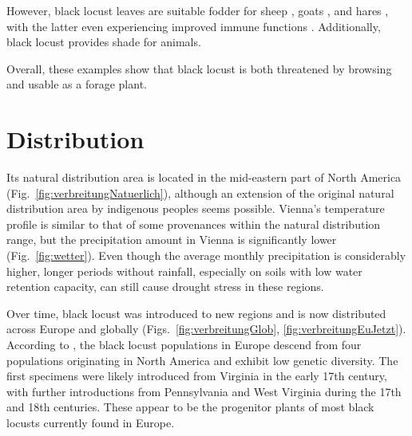However, black locust leaves are suitable fodder for sheep \citep{ganai2009robnieSchaf}, goats \citep{papachristou1999robinieZiege}, and hares \citep{singh2010robnieHasennahrung}, with the latter even experiencing improved immune functions \citep{yang2017robinieHasen}. Additionally, black locust provides shade for animals.

Overall, these examples show that black locust is both threatened by browsing and usable as a forage plant.


\section{Distribution}


Its natural distribution area is located in the mid-eastern part of North America (Fig.~\ref{fig:verbreitungNatuerlich}), although an extension of the original natural distribution area by indigenous peoples seems possible. Vienna's temperature profile is similar to that of some provenances within the natural distribution range, but the precipitation amount in Vienna is significantly lower (Fig.~\ref{fig:wetter}). Even though the average monthly precipitation is considerably higher, longer periods without rainfall, especially on soils with low water retention capacity, can still cause drought stress in these regions.


Over time, black locust was introduced to new regions and is now distributed across Europe and globally (Figs.~\ref{fig:verbreitungGlob}, \ref{fig:verbreitungEuJetzt}). According to \citet{bouteiller2019robinie}, the black locust populations in Europe descend from four populations originating in North America and exhibit low genetic diversity. The first specimens were likely introduced from Virginia in the early 17th century, with further introductions from Pennsylvania and West Virginia during the 17th and 18th centuries. These appear to be the progenitor plants of most black locusts currently found in Europe.

